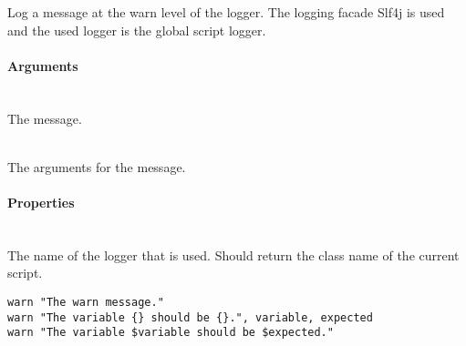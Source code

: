 %


Log a message at the warn level of the logger.
The logging facade Slf4j\cite{slf4j13} is used and the used logger is
the global script logger.

\paragraph{Arguments}

\begin{asparadesc}
%
\item[\code{message}] \hfill \\
The message.
%
\item[\code{args}] \hfill \\
The arguments for the message.
%
\end{asparadesc}

\paragraph{Properties}

\begin{asparadesc}
%
\item[\code{name}] \hfill \\
The name of the logger that is used. Should return the class name of the current
script.
%
\end{asparadesc}

\begin{lstlisting}[style=Groovybash, label={lst:example_warn}]
warn "The warn message."
warn "The variable {} should be {}.", variable, expected
warn "The variable $variable should be $expected."
\end{lstlisting}

